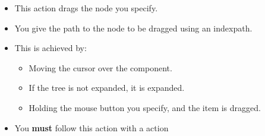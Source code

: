 
\begin{itemize}
\item This action drags the node you specify.
\item You give the path to the node to be dragged using an indexpath.
\item This is achieved by:
\begin{itemize}
\item Moving the cursor over the component.
\item If the tree is not expanded, it is expanded.
\item Holding the mouse button you specify, and the item is dragged. 
\end{itemize}
\item You \textbf{must} follow this action with a  action
\end{itemize}
